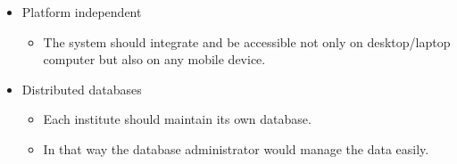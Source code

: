 \begin{itemize}	
		\item Platform independent
			\begin{itemize}
				\item The system should integrate and be accessible not only on 						desktop/laptop computer but also on any mobile device.
			\end{itemize}
\end{itemize}

\begin{itemize}	
		\item Distributed databases
			\begin{itemize}
				\item Each institute should maintain its own database. 
				\item In that way the database administrator would manage the data 						easily.
			\end{itemize}
\end{itemize}

